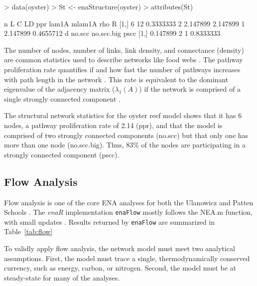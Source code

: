 \documentclass[article]{jss}
\begin{document}
\begin{Schunk}
\begin{Sinput}
> data(oyster)
> St <- enaStructure(oyster)
> attributes(St)
\end{Sinput}
\begin{Soutput}
     n  L         C LD      ppr    lam1A mlam1A      rho         R
[1,] 6 12 0.3333333  2 2.147899 2.147899      1 2.147899 0.4655712
            d no.scc no.scc.big      pscc
[1,] 0.147899      2          1 0.8333333
\end{Soutput}
\end{Schunk}


The number of nodes, number of links, link density, and connectance
(density) are common statistics used to describe networks like food
webs \citep{martinez1992constant, dunne02food, eklof2006, estrada2007,
  brandes05}.  The pathway proliferation rate quantifies if and how
fast the number of pathways increases with path length in the network
\citep{borrett03, borrett07_jtb}.  This rate is equivalent to the
dominant eigenvalue of the adjacency matrix ($\lambda_1(A)$) if the
network is comprised of a single strongly connected component
\citep{borrett07_jtb}.

The structural network statistics for the oyster reef model shows that
it has 6 nodes, a pathway proliferation rate of 2.14 (ppr), and that
the model is comprised of two strongly connected components (no.scc)
but that only one has more than one node (no.scc.big).  Thus, 83\% of
the nodes are participating in a strongly connected component (pscc).


\subsection{Flow Analysis}

Flow analysis is one of the core ENA analyses
for both the Ulanowicz and Patten Schools \citep{fath99_review,
  latham2006, fath06, schramski11}.  The \textit{enaR} implementation
\texttt{enaFlow} mostly follows the NEA.m function, with small updates
\cite[e.g. calculating the ratio of indirect-to-direct
flows][]{borrett11_ree,borrett11_equ}. Results returned by
\texttt{enaFlow} are summarized in Table~\ref{tab:flow}

To validly apply flow analysis, the network model must meet two
analytical assumptions.  First, the model must trace a single,
thermodynamically conserved currency, such as energy, carbon, or
nitrogen.  Second, the model must be at steady-state for many of the
analyses.
\end{document}
